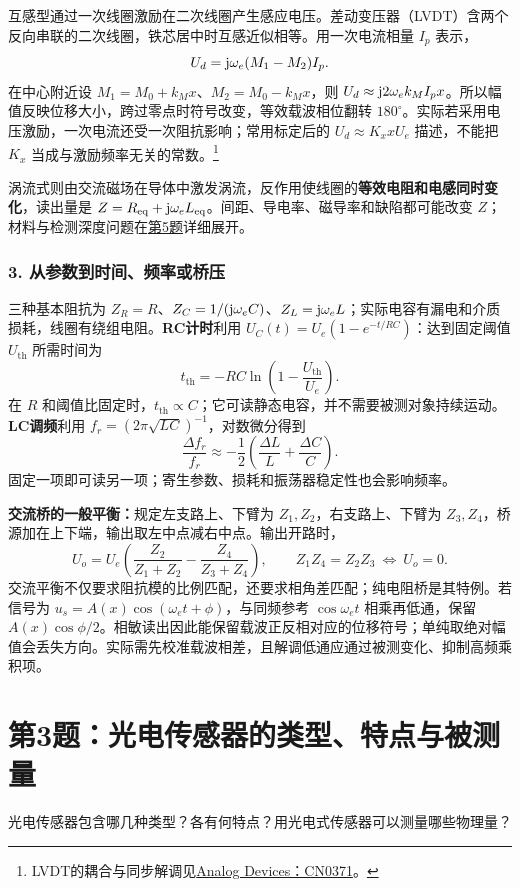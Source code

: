 互感型通过一次线圈激励在二次线圈产生感应电压。差动变压器（LVDT）含两个反向串联的二次线圈，铁芯居中时互感近似相等。用一次电流相量 $I_p$ 表示，
\[
U_d=\mathrm{j}\omega_e(M_1-M_2)I_p.
\]
在中心附近设 $M_1=M_0+k_Mx$、$M_2=M_0-k_Mx$，则 $U_d\approx\mathrm{j}2\omega_e k_MI_px$。所以幅值反映位移大小，跨过零点时符号改变，等效载波相位翻转 $180^\circ$。实际若采用电压激励，一次电流还受一次阻抗影响；常用标定后的 $U_d\approx K_xxU_e$ 描述，不能把 $K_x$ 当成与激励频率无关的常数。\footnote{LVDT的耦合与同步解调见\href{https://www.analog.com/en/resources/reference-designs/circuits-from-the-lab/cn0371.html}{Analog Devices：CN0371}。}

涡流式则由交流磁场在导体中激发涡流，反作用使线圈的\textbf{等效电阻和电感同时变化}，读出量是 $Z=R_{\mathrm{eq}}+\mathrm{j}\omega_eL_{\mathrm{eq}}$。间距、导电率、磁导率和缺陷都可能改变 $Z$；材料与检测深度问题在\hyperref[kn:4-5]{第5题}详细展开。

\subsubsection*{3. 从参数到时间、频率或桥压}
三种基本阻抗为 $Z_R=R$、$Z_C=1/(\mathrm{j}\omega_e C)$、$Z_L=\mathrm{j}\omega_e L$；实际电容有漏电和介质损耗，线圈有绕组电阻。\textbf{RC计时}利用 $U_C(t)=U_e(1-e^{-t/RC})$：达到固定阈值 $U_{\mathrm{th}}$ 所需时间为
\[
t_{\mathrm{th}}=-RC\ln\!\left(1-\frac{U_{\mathrm{th}}}{U_e}\right).
\]
在 $R$ 和阈值比固定时，$t_{\mathrm{th}}\propto C$；它可读静态电容，并不需要被测对象持续运动。\textbf{LC调频}利用 $f_r=(2\pi\sqrt{LC})^{-1}$，对数微分得到
\[
\frac{\Delta f_r}{f_r}\approx-\frac12
\left(\frac{\Delta L}{L}+\frac{\Delta C}{C}\right).
\]
固定一项即可读另一项；寄生参数、损耗和振荡器稳定性也会影响频率。

\textbf{交流桥的一般平衡：}规定左支路上、下臂为 $Z_1,Z_2$，右支路上、下臂为 $Z_3,Z_4$，桥源加在上下端，输出取左中点减右中点。输出开路时，
\[
U_o=U_e\left(\frac{Z_2}{Z_1+Z_2}-\frac{Z_4}{Z_3+Z_4}\right),\qquad
\boxed{Z_1Z_4=Z_2Z_3\ \Longleftrightarrow\ U_o=0}.
\]
交流平衡不仅要求阻抗模的比例匹配，还要求相角差匹配；纯电阻桥是其特例。若信号为 $u_s=A(x)\cos(\omega_et+\phi)$，与同频参考 $\cos\omega_et$ 相乘再低通，保留 $A(x)\cos\phi/2$。相敏读出因此能保留载波正反相对应的位移符号；单纯取绝对幅值会丢失方向。实际需先校准载波相差，且解调低通应通过被测变化、抑制高频乘积项。

\section{第3题：光电传感器的类型、特点与被测量}
\label{hw:4-3}
\begin{hwquestion}
光电传感器包含哪几种类型？各有何特点？用光电式传感器可以测量哪些物理量？
\end{hwquestion}

